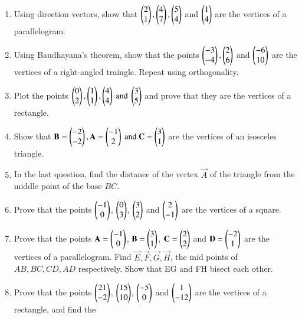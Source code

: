 \begin{enumerate}[label=\arabic*.,ref=\thesubsection.\theenumi]
\item Using direction vectors, show that  $\begin{pmatrix}2\\1\end{pmatrix}, \begin{pmatrix}4\\7\end{pmatrix}, \begin{pmatrix}5\\4\end{pmatrix}$ and $\begin{pmatrix}1\\4\end{pmatrix}$ are the vertices of a parallelogram.
\solution

\item Using Baudhayana's theorem, show that the points $\begin{pmatrix}-3\\-4\end{pmatrix}, \begin{pmatrix}2\\6\end{pmatrix}$ and $\begin{pmatrix}-6\\10\end{pmatrix}$  are the vertices of a right-angled
traingle.  Repeat using orthogonality.
\solution

\item Plot the points $\begin{pmatrix}0\\2\end{pmatrix},\begin{pmatrix}1\\1\end{pmatrix},\begin{pmatrix}4\\4\end{pmatrix}\text{ and }\begin{pmatrix}3\\5\end{pmatrix}$ and prove that they are the vertices of a rectangle.
\item Show that $\mathbf{B}=\begin{pmatrix}-2\\-2\end{pmatrix},\mathbf{A}=\begin{pmatrix}-1\\2\end{pmatrix}\text{ and }\mathbf{C}=\begin{pmatrix}3\\1\end{pmatrix}$ are the vertices of an isosceles triangle.
\item In the last question, find the distance of the vertex $\vec{A}$ of the triangle from the middle point of the base $BC$.
\item Prove that the points $\begin{pmatrix}-1\\0\end{pmatrix}$, $\begin{pmatrix}0\\3\end{pmatrix}$, $\begin{pmatrix}3\\2\end{pmatrix}$ and $\begin{pmatrix}2\\-1\end{pmatrix}$ are the vertices of a square.
\item Prove that the points $\mathbf{A}=\begin{pmatrix}-1\\0\end{pmatrix}$, $\mathbf{B}=\begin{pmatrix}3\\1\end{pmatrix}$, $\mathbf{C}=\begin{pmatrix}2\\2\end{pmatrix}$  and $\mathbf{D}=\begin{pmatrix}-2\\1\end{pmatrix}$ are the vertices of a parallelogram.  Find $\vec{E},\vec{F},\vec{G},\vec{H}$, the mid points of $AB, BC, CD, AD$ respectively.  Show that EG and FH bisect each other.
\item Prove that the points $\begin{pmatrix}21\\-2\end{pmatrix}$, $\begin{pmatrix}15\\10\end{pmatrix}$, $\begin{pmatrix}-5\\0\end{pmatrix}$  and $\begin{pmatrix}1\\-12\end{pmatrix}$ are the vertices of a rectangle, and find the

\end{enumerate}
